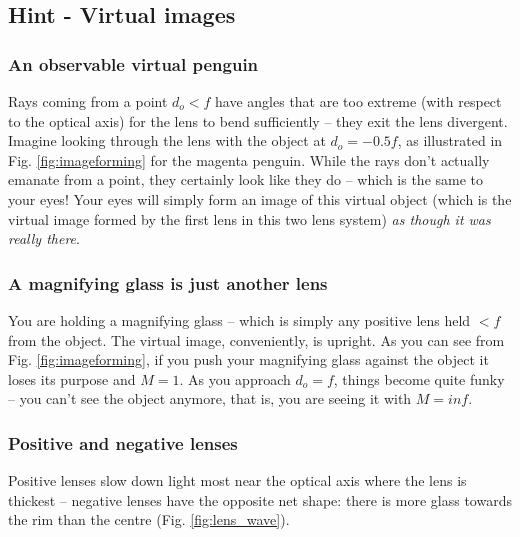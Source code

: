 \documentclass[a4paper]{report}
\begin{document}
	\clearpage

    \subsection{Hint - Virtual images}
	\hypertarget{hintTo-virtual}{}

	\subsubsection{An observable virtual penguin}
	Rays coming from a point $d_o<f$ have angles that are too extreme (with respect to the optical axis) for the lens to bend sufficiently -- they exit the lens divergent.
	Imagine looking through the lens with the object at $d_o=-0.5f$, as illustrated in Fig. \ref{fig:imageforming} for the magenta penguin.
	While the rays don't actually emanate from a point, they certainly look like they do -- which is the same to your eyes!
	Your eyes will simply form an image of this virtual object (which is the virtual image formed by the first lens in this two lens system) \emph{as though it was really there}.



	\subsubsection{A magnifying glass is just another lens}
	You are holding a magnifying glass -- which is simply any positive lens held $<f$ from the object. The virtual image, conveniently, is upright.
	As you can see from Fig. \ref{fig:imageforming}, if you push your magnifying glass against the object it loses its purpose and $M=1$.
	As you approach $d_o=f$, things become quite funky -- you can't see the object anymore, that is, you are seeing it with $M=inf$.



	\subsubsection{Positive and negative lenses}
	Positive lenses slow down light most near the optical axis where the lens is thickest -- negative lenses have the opposite net shape: there is more glass towards the rim than the centre (Fig. \ref{fig:lens_wave}).
\end{document}

